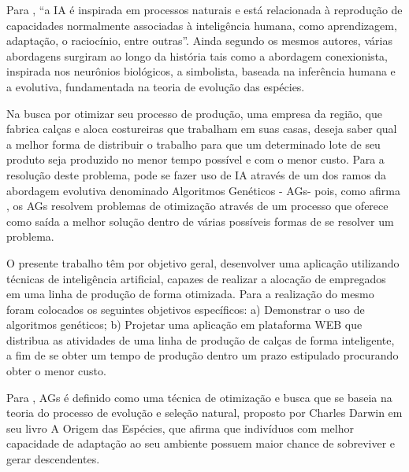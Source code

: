 \par Para , “a IA é inspirada  em  
processos naturais e está relacionada à reprodução de   capacidades  
normalmente   associadas   à   inteligência   humana,   como aprendizagem,
adaptação,   o   raciocínio,   entre   outras”.   Ainda   segundo   os   mesmos
autores,   várias  abordagens   surgiram   ao   longo   da   história   tais   como  
a abordagem   conexionista,   inspirada   nos  neurônios   biológicos,   a  
simbolista, baseada   na   inferência   humana   e   a   evolutiva, fundamentada na teoria
de evolução das espécies.

\par Na busca por otimizar seu processo de produção, uma empresa da região, que
fabrica calças e aloca costureiras que trabalham em suas casas, deseja saber
qual a melhor forma de distribuir o trabalho para que um determinado lote de seu produto
seja produzido no menor tempo possível e com o menor custo. Para a resolução
deste problema, pode se fazer uso de IA através de um dos ramos da abordagem
evolutiva denominado Algoritmos Genéticos - AGs\footnotemark[2] - pois, como
afirma , os AGs resolvem problemas de
otimização através de um processo que oferece como saída a melhor solução
dentro de várias possíveis formas de se resolver um problema.



\par O presente trabalho têm por objetivo geral, desenvolver uma aplicação
utilizando técnicas de inteligência artificial, capazes de realizar a alocação
de empregados em uma linha de produção de forma otimizada. Para a realização do mesmo foram
colocados os seguintes objetivos específicos: a) Demonstrar o uso de algoritmos
genéticos; b) Projetar uma aplicação em plataforma WEB que distribua as
atividades de uma linha de produção de calças de forma inteligente, a fim de se
obter um tempo de produção dentro um prazo estipulado procurando obter o menor custo.

\par Para , AGs é definido
como uma técnica de otimização e busca que se baseia na teoria do processo de evolução e seleção
natural, proposto por Charles Darwin em seu livro A Origem das Espécies, que
afirma que indivíduos com melhor capacidade de adaptação ao seu ambiente possuem
maior chance de sobreviver e gerar descendentes.

